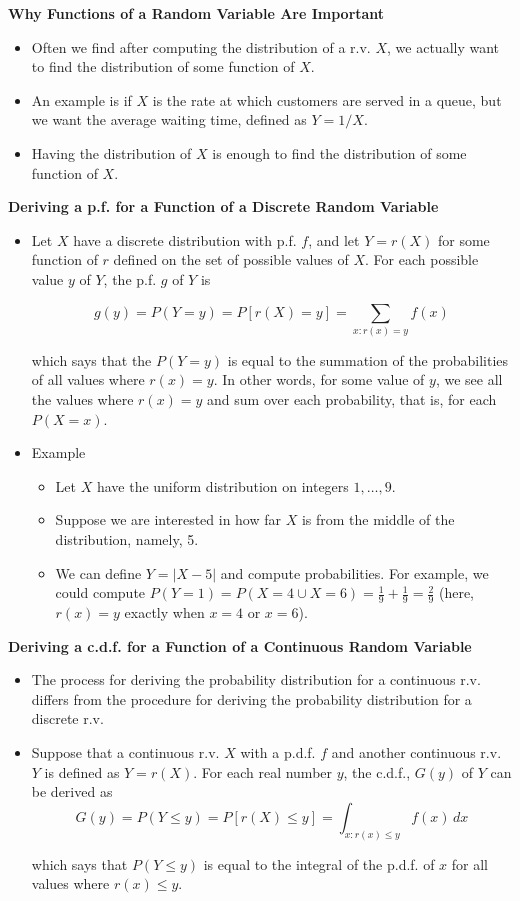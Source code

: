 \documentclass[11pt]{article}
\begin{document}
\textbf{Why Functions of a Random Variable Are Important}
\begin{itemize}
    \item Often we find after computing the distribution of a r.v. $X$, we actually want to 
    find the distribution of some function of $X$.
    \item An example is if $X$ is the rate at which customers are served in a queue, but we 
    want the average waiting time, defined as $Y = 1/X$.
    \item Having the distribution of $X$ is enough to find the distribution of some function 
    of $X$.
\end{itemize}

\textbf{Deriving a p.f. for a Function of a Discrete Random Variable}
\begin{itemize}
    \item Let $X$ have a discrete distribution with p.f. $f$, and let $Y=r(X)$ for some 
    function of $r$ defined on the set of possible values of $X$. For each possible value $y$
    of $Y$, the p.f. $g$ of $Y$ is

    \[g(y) = P(Y=y) = P[r(X)=y] = \sum_{x:r(x)=y} f(x)\]

    which says that the $P(Y=y)$ is equal to the summation of the probabilities of all values 
    where $r(x)=y$. In other words, for some value of $y$, we see all the values where $r(x)
    =y$ and sum over each probability, that is, for each $P(X=x)$.

    \item Example
    \begin{itemize}
        \item Let $X$ have the uniform distribution on integers $1, \ldots, 9$.
        \item Suppose we are interested in how far $X$ is from the middle of the distribution, 
        namely, 5. 
        \item We can define $Y= |X-5|$ and compute probabilities. For example, we could 
        compute $P(Y=1) = P(X=4 \cup X=6) = \frac{1}{9} + \frac{1}{9} = \frac{2}{9}$ (here, 
        $r(x)=y$ exactly when $x=4$ or $x=6$).
    \end{itemize}
\end{itemize}

\textbf{Deriving a c.d.f. for a Function of a Continuous Random Variable}
\begin{itemize}
    \item The process for deriving the probability distribution for a continuous r.v. differs
    from the procedure for deriving the probability distribution for a discrete r.v. 
    \item Suppose that a continuous r.v. $X$ with a p.d.f. $f$ and another continuous r.v. $Y$
    is defined as $Y=r(X)$. For each real number $y$, the c.d.f., $G(y)$ of $Y$ can be derived
    as 
    \[G(y) = P(Y \le y) = P[r(X) \le y] = \int_{{x:r(x) \le y}} f(x) \,dx \]

    which says that $P(Y \le y)$ is equal to the integral of the p.d.f. of $x$ for all values 
    where $r(x) \le y$.
\end{itemize}
\end{document}
